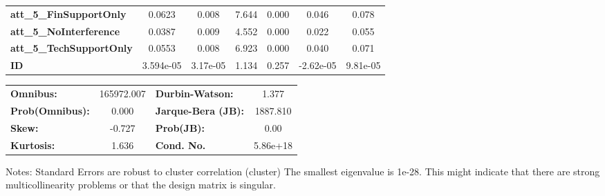 \begin{center}
\begin{tabular}{lcccccc}
\textbf{att\_5\_FinSupportOnly}      &       0.0623  &        0.008     &     7.644  &         0.000        &        0.046    &        0.078     \\
\textbf{att\_5\_NoInterference}      &       0.0387  &        0.009     &     4.552  &         0.000        &        0.022    &        0.055     \\
\textbf{att\_5\_TechSupportOnly}     &       0.0553  &        0.008     &     6.923  &         0.000        &        0.040    &        0.071     \\
\textbf{ID}                          &    3.594e-05  &     3.17e-05     &     1.134  &         0.257        &    -2.62e-05    &     9.81e-05     \\
\bottomrule
\end{tabular}
\begin{tabular}{lclc}
\textbf{Omnibus:}       & 165972.007 & \textbf{  Durbin-Watson:     } &    1.377  \\
\textbf{Prob(Omnibus):} &    0.000   & \textbf{  Jarque-Bera (JB):  } & 1887.810  \\
\textbf{Skew:}          &   -0.727   & \textbf{  Prob(JB):          } &     0.00  \\
\textbf{Kurtosis:}      &    1.636   & \textbf{  Cond. No.          } & 5.86e+18  \\
\bottomrule
\end{tabular}
\end{center}

Notes: \newline
 [1] Standard Errors are robust to cluster correlation (cluster) \newline
 [2] The smallest eigenvalue is  1e-28. This might indicate that there are \newline
 strong multicollinearity problems or that the design matrix is singular.